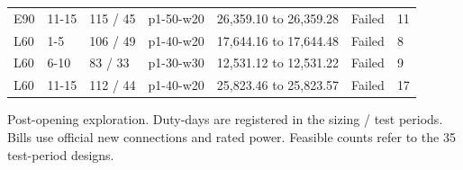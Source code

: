\begin{minipage}{\linewidth}
{\begin{tabular}{lllllll}
E90 & 11-15 & 115 / 45 & p1-50-w20 & 26,359.10 to 26,359.28 & Failed & 11 \\
L60 & 1-5 & 106 / 49 & p1-40-w20 & 17,644.16 to 17,644.48 & Failed & 8 \\
L60 & 6-10 & 83 / 33 & p1-30-w30 & 12,531.12 to 12,531.22 & Failed & 9 \\
L60 & 11-15 & 112 / 44 & p1-40-w20 & 25,823.46 to 25,823.57 & Failed & 17 \\
\bottomrule
\end{tabular}}%
\ifdim\wd0>\linewidth\resizebox{\linewidth}{!}{\usebox0}\else\usebox0\fi
\par\smallskip\footnotesize Post-opening exploration. Duty-days are registered in the sizing / test periods. Bills use official new connections and rated power. Feasible counts refer to the 35 test-period designs.
\end{minipage}
